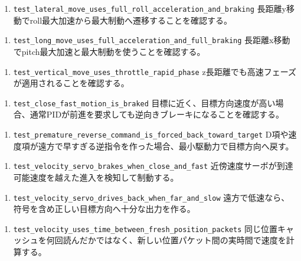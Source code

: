 \documentclass[10pt,a4paper,openany]{ltjsbook}
\begin{document}
\begin{enumerate}
\item \texttt{test\_lateral\_move\_uses\_full\_roll\_acceleration\_and\_braking}  
長距離y移動でroll最大加速から最大制動へ遷移することを確認する。\par
\end{enumerate}
\begin{enumerate}
\item \texttt{test\_long\_move\_uses\_full\_acceleration\_and\_full\_braking}  
長距離x移動でpitch最大加速と最大制動を使うことを確認する。\par
\end{enumerate}
\begin{enumerate}
\item \texttt{test\_vertical\_move\_uses\_throttle\_rapid\_phase}  
z長距離でも高速フェーズが適用されることを確認する。\par
\end{enumerate}
\begin{enumerate}
\item \texttt{test\_close\_fast\_motion\_is\_braked}  
目標に近く、目標方向速度が高い場合、通常PIDが前進を要求しても逆向きブレーキになることを確認する。\par
\end{enumerate}
\begin{enumerate}
\item \texttt{test\_premature\_reverse\_command\_is\_forced\_back\_toward\_target}  
D項や速度項が遠方で早すぎる逆指令を作った場合、最小駆動力で目標方向へ戻す。\par
\end{enumerate}
\begin{enumerate}
\item \texttt{test\_velocity\_servo\_brakes\_when\_close\_and\_fast}  
近傍速度サーボが到達可能速度を越えた進入を検知して制動する。\par
\end{enumerate}
\begin{enumerate}
\item \texttt{test\_velocity\_servo\_drives\_back\_when\_far\_and\_slow}  
遠方で低速なら、符号を含め正しい目標方向へ十分な出力を作る。\par
\end{enumerate}
\begin{enumerate}
\item \texttt{test\_velocity\_uses\_time\_between\_fresh\_position\_packets}  
同じ位置キャッシュを何回読んだかではなく、新しい位置パケット間の実時間で速度を計算する。\par
\end{enumerate}
\end{document}

